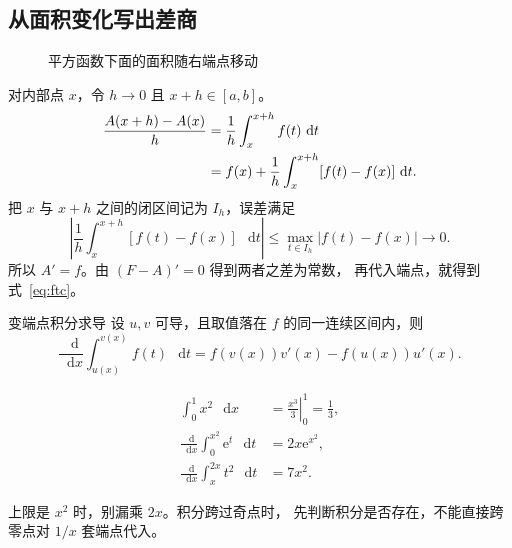 \documentclass[UTF8,11pt,a4paper,oneside,openany,linespread=1]{ctexbook}
\newcommand{\dd}{\mathop{}\!\mathrm{d}}
\numberwithin{equation}{chapter}
\begin{document}
\subsection{从面积变化写出差商}
\begin{figure}[htbp]
\centering
{}
\caption{平方函数下面的面积随右端点移动}\label{fig:area}
\end{figure}

对内部点 \(x\)，令 \(h\to0\) 且 \(x+h\in[a,b]\)。
\begin{align}
  \frac{A(x+h)-A(x)}{h}
    &=\frac{1}{h}\int_x^{x+h}f(t)\,\dd t \notag\\
    &=f(x)+\frac{1}{h}\int_x^{x+h}[f(t)-f(x)]\,\dd t.
\end{align}
把 \(x\) 与 \(x+h\) 之间的闭区间记为 \(I_h\)，误差满足
\[
  \left|\frac{1}{h}\int_x^{x+h}[f(t)-f(x)]\,\dd t\right|
  \leq\max_{t\in I_h}|f(t)-f(x)|\longrightarrow0.
\]
所以 \(A'=f\)。由 \((F-A)'=0\) 得到两者之差为常数，
再代入端点，就得到式~\eqref{eq:ftc}。

\begin{methodbox}{变端点积分求导}
设 \(u,v\) 可导，且取值落在 \(f\) 的同一连续区间内，则
\[
  \frac{\dd}{\dd x}\int_{u(x)}^{v(x)}f(t)\,\dd t
  =f(v(x))v'(x)-f(u(x))u'(x).
\]
\end{methodbox}
\begin{align*}
  \int_0^1x^2\,\dd x&=\left.\frac{x^3}{3}\right|_0^1=\frac13,\\
  \frac{\dd}{\dd x}\int_0^{x^2}\mathrm{e}^t\,\dd t&=2x\mathrm{e}^{x^2},\\
  \frac{\dd}{\dd x}\int_x^{2x}t^2\,\dd t&=7x^2.
\end{align*}
\begin{pitfallbox}
上限是 \(x^2\) 时，别漏乘 \(2x\)。积分跨过奇点时，
先判断积分是否存在，不能直接跨零点对 \(1/x\) 套端点代入。
\end{pitfallbox}
\end{document}
